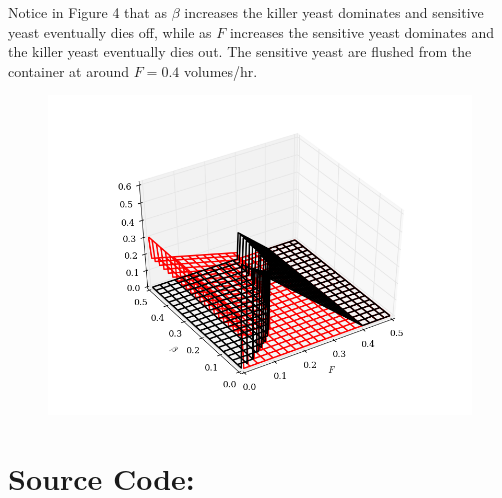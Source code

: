 Notice in Figure 4 that as $\beta$ increases the killer yeast dominates and sensitive yeast eventually dies off, while as $F$ increases the sensitive yeast dominates and the killer yeast eventually dies out.  The sensitive yeast are flushed from the container at around $F = 0.4$ volumes/hr.

\begin{figure}[H]
  \centering
    \includegraphics[width=1.0\textwidth]{images/3d.png}
\end{figure}


\section*{Source Code:}





